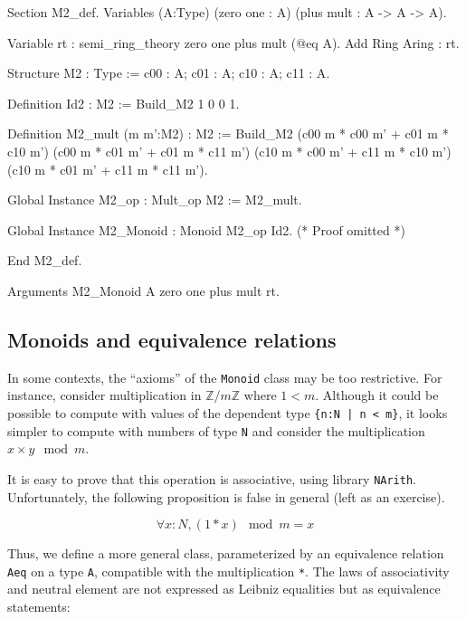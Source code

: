 \begin{Coqsrc}
Section M2_def.
Variables (A:Type)
           (zero one : A) 
           (plus mult  : A -> A -> A).

 Variable rt : semi_ring_theory  zero one plus mult  (@eq A).
 Add  Ring Aring : rt.
\end{Coqsrc}

\begin{Coqsrc}
Structure M2 : Type := {c00 : A;  c01 : A;
                        c10 : A;  c11 : A}.

Definition Id2 : M2 := Build_M2 1 0 0 1.

Definition M2_mult (m m':M2) : M2 :=
 Build_M2 
          (c00 m * c00 m' + c01 m * c10 m')
          (c00 m * c01 m' + c01 m * c11 m')
          (c10 m * c00 m' + c11 m * c10 m')
          (c10 m * c01 m' + c11 m * c11 m').

Global Instance M2_op : Mult_op M2 := M2_mult.
\end{Coqsrc}

\begin{Coqsrc}
Global Instance M2_Monoid : Monoid   M2_op Id2.
(* Proof omitted *)

End M2_def.

Arguments M2_Monoid {A zero one plus mult} rt.
\end{Coqsrc}


\subsection{Monoids and equivalence relations}

In some contexts, the ``axioms'' of the \texttt{Monoid} class  may be too restrictive.
For instance, consider multiplication in $\mathds{Z}/m\mathds{Z}$ where
 $1<m$.
Although it could be possible to compute with values of the dependent 
type \texttt{\{n:N | n < m\}}, 
it looks simpler to compute with numbers of type
\texttt{N} and consider the multiplication $x \times y \mod{m}$.



It is easy to prove that this operation is associative, using library \texttt{NArith}. Unfortunately, the following proposition is false in general (left as an exercise).

$$\forall x:N, (1 * x) \mod{m} = x$$


Thus, we define a more general class, parameterized by an equivalence
relation \texttt{Aeq}  on a type \texttt{A}, compatible with the multiplication \texttt{*}. The laws of associativity and neutral element
are not expressed as Leibniz equalities but as equivalence statements:


